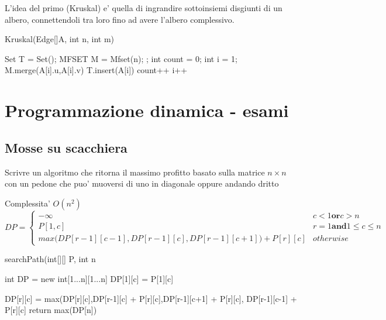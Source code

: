 \documentclass[oneside]{book}
\begin{document}
L'idea del primo (Kruskal) e' quella di ingrandire sottoinsiemi disgiunti di un albero, connettendoli tra loro fino ad avere l'albero complessivo.

\begin{algorithm}
\caption{Kruskal(Edge[]A, int n, int m)\label{alg:cap}}

\begin{algorithmic}
\State Set T = Set();
\State MFSET M = Mfset(n);
;
\State int count = 0;
\State int i = 1;
	\State M.merge(A[i].u,A[i].v)
	\State T.insert(A[i])
	\State count++
	\EndIf
	\State i++
\EndWhile

\end{algorithmic}
\end{algorithm}



\chapter{Programmazione dinamica - esami}

\section{Mosse su scacchiera}
Scrivre un algoritmo che ritorna il massimo profitto basato sulla matrice $n\times n$ con un pedone che puo' muoversi di uno in diagonale oppure andando dritto

Complessita' $O(n^2)$ 
\begin{equation}
	DP =
	\begin{cases}
	- \infty & c<1 \textbf{or} c>n \\
	P[1,c] & r = 1 \textbf{and} 1\leq c \leq n \\
	max \Bigg ( DP[r-1][c-1], DP[r-1][c], DP[r-1][c+1]) + P[r][c] & otherwise
	\end{cases}
\end{equation}

\begin{algorithm}
\caption{searchPath(int[][] P, int n}
\begin{algorithmic}
\State int DP = new int[1...n][1...n]
	\State DP[1][c] = P[1][c]
\EndFor

		\State DP[r][c] = max(DP[r][c],DP[r-1][c] + P[r][c],DP[r-1][c+1] + P[r][c], DP[r-1][c-1] + P[r][c]
	\EndFor	
\EndFor
\State return max(DP[n])
\end{algorithmic}
\end{algorithm}
\end{document}
